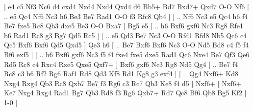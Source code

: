 \makegametitle 
|   e4   c5    Nf3   Nc6    d4   cxd4    Nxd4   Nxd4    Qxd4   d6    Bb5+   Bd7    Bxd7+   Qxd7    O-O   Nf6    [ .. e5  Qc4 Nf6  Nc3 h6  Be3 Be7  Rad1 O-O  f3 Rfc8  Qb4   ]  [ .. Nf6  Nc3 e5  Qc4 h6  f4 Be7  fxe5 Rc8  Qb3 dxe5  Be3 O-O  Bxa7   ]  Bg5   e5    [ .. h6  Bxf6 gxf6  Nc3 Rg8  Rfe1 b6  Rad1 Rc8  g3 Bg7  Qd5 Rc5   ]  [ .. e5  Qd3 Be7  Nc3 O-O  Rfd1 Rfd8  Nb5 Qc6  c4 Qc5  Bxf6 Bxf6  Qd5 Qxd5   ]  Qe3   h6 [ .. Be7  Bxf6 Bxf6  Nc3 O-O  Nd5 Bd8  c4 f5  f4 Bf6  exf5   ]  [ .. h6  Bxf6 gxf6  Nc3 f5  f4 fxe4  fxe5 dxe5  Rad1 Qc6  Nxe4 Be7  Qf3 Qe6  Rd5 Rc8  c4 Rxc4  Rxe5 Qxe5  Qxf7+   ]  Bxf6   gxf6    Nc3   Rg8    Nd5   Qg4 [ .. Be7  f4 Rc8  c3 b6  Rf2 Rg6  Raf1 Rd8  Qd3 Kf8  Rd1 Kg8  g3 exf4   ]  [ .. Qg4  Nxf6+ Kd8  Nxg4 Rxg4  Qb3 Rc8  Qxb7 Be7  f3 Rg6  c3 Rc7  Qb3 Ke8  f4 d5   ]  Nxf6+    [  Nxf6+ Ke7  Nxg4 Rxg4  Rad1 Bg7  Qb3 Rd8  f3 Rg6  Qxb7+ Rd7  Qc8 Bf6  Qb8 Bg5  Kf2   ] 1-0  |
